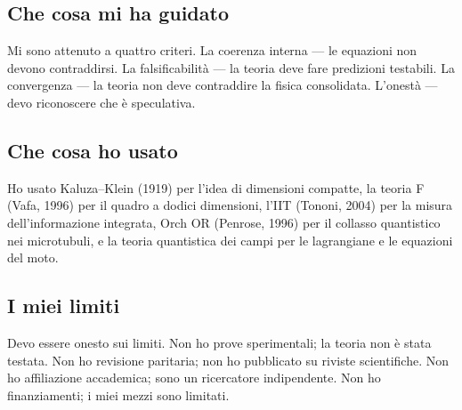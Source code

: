 \subsection{Che cosa mi ha guidato}
Mi sono attenuto a quattro criteri. La coerenza interna --- le equazioni non devono contraddirsi. La falsificabilità --- la teoria deve fare predizioni testabili. La convergenza --- la teoria non deve contraddire la fisica consolidata. L'onestà --- devo riconoscere che è speculativa.

\subsection{Che cosa ho usato}
Ho usato Kaluza--Klein (1919) per l'idea di dimensioni compatte, la teoria F (Vafa, 1996) per il quadro a dodici dimensioni, l'IIT (Tononi, 2004) per la misura dell'informazione integrata, Orch OR (Penrose, 1996) per il collasso quantistico nei microtubuli, e la teoria quantistica dei campi per le lagrangiane e le equazioni del moto.

\subsection{I miei limiti}
Devo essere onesto sui limiti. Non ho prove sperimentali; la teoria non è stata testata. Non ho revisione paritaria; non ho pubblicato su riviste scientifiche. Non ho affiliazione accademica; sono un ricercatore indipendente. Non ho finanziamenti; i miei mezzi sono limitati.
